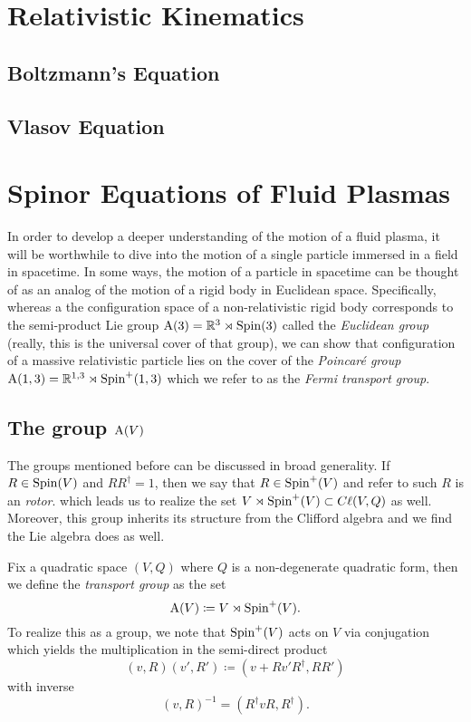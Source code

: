 \documentclass[conf]{new-aiaa}
\begin{document}
\section{Relativistic Kinematics}

\subsection{Boltzmann's Equation}

\subsection{Vlasov Equation}

\section{Spinor Equations of Fluid Plasmas}
\label{sec:spinor_equations}

In order to develop a deeper understanding of the motion of a fluid plasma, it will be worthwhile to dive into the motion of a single particle immersed in a field in spacetime. In some ways, the motion of a particle in spacetime can be thought of as an analog of the motion of a rigid body in Euclidean space. Specifically, whereas a the configuration space of a non-relativistic rigid body corresponds to the semi-product Lie group $\mathrm{A}(3)=\mathbb{R}^3 \rtimes \operatorname{Spin}(3)$ called the \emph{Euclidean group} (really, this is the universal cover of that group), we can show that configuration of a massive relativistic particle lies on the cover of the \emph{Poincar\'e group} $\mathrm{A}(1,3) = \mathbb{R}^{1,3} \rtimes \operatorname{Spin}^+(1,3)$ which we refer to as the \emph{Fermi transport group}.

\subsection{The group $\operatorname{A}(V)$}

The groups mentioned before can be discussed in broad generality.  If $R\in \operatorname{Spin}(V)$ and $RR^\dagger = 1$, then we say that $R\in \operatorname{Spin}^+(V)$ and refer to such $R$ is an \emph{rotor}. which leads us to realize the set $V\rtimes \operatorname{Spin}^+(V) \subset C\ell(V,Q)$ as well. Moreover, this group inherits its structure from the Clifford algebra and we find the Lie algebra does as well. 

\begin{definition}
Fix a quadratic space $(V,Q)$ where $Q$ is a non-degenerate quadratic form, then we define the \emph{transport group} as the set
\begin{equation}
\operatorname{A}(V)\coloneqq V\rtimes \operatorname{Spin}^+(V).
\end{equation}
To realize this as a group, we note that $\operatorname{Spin}^+(V)$ acts on $V$ via conjugation which yields the multiplication in the semi-direct product
\begin{equation}
\label{eq:product_in_A}
(v,R)(v',R')\coloneqq(v+Rv'R^\dagger, RR')
\end{equation}
with inverse
\begin{equation}
(v,R)^{-1} = (R^\dagger v R, R^\dagger).
\end{equation}
\end{definition}
\end{document}
